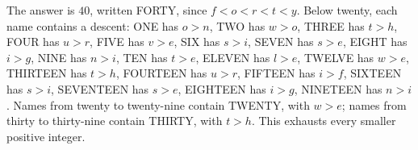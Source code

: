 The answer is $\boxed{40}$, written FORTY, since $ f<o<r<t<y $. Below twenty, each name contains a descent: ONE has $ o>n $, TWO has $ w>o $, THREE has $ t>h $, FOUR has $ u>r $, FIVE has $ v>e $, SIX has $ s>i $, SEVEN has $ s>e $, EIGHT has $ i>g $, NINE has $ n>i $, TEN has $ t>e $, ELEVEN has $ l>e $, TWELVE has $ w>e $, THIRTEEN has $ t>h $, FOURTEEN has $ u>r $, FIFTEEN has $ i>f $, SIXTEEN has $ s>i $, SEVENTEEN has $ s>e $, EIGHTEEN has $ i>g $, NINETEEN has $ n>i $. Names from twenty to twenty-nine contain TWENTY, with $ w>e $; names from thirty to thirty-nine contain THIRTY, with $ t>h $. This exhausts every smaller positive integer.
